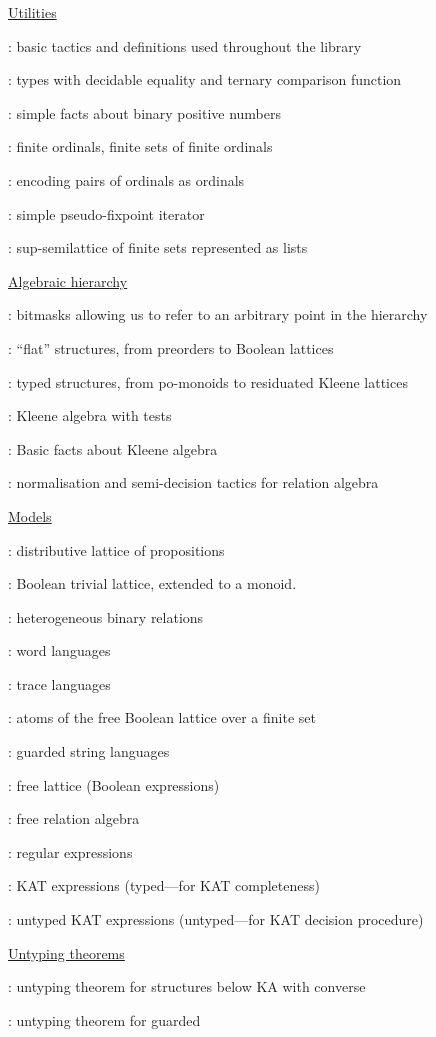 \documentclass[a4paper]{llncs}
\begin{document}
\newcommand\module[1]{\item \coqe:}
\begin{description}
  \item {}\ul{Utilities}
  \begin{description}
    \module{common} basic tactics and definitions used
    throughout the library
    \module{comparisons} types with decidable equality
    and ternary comparison function
    \module{positives} simple facts about binary positive numbers
    \module{ordinal} finite ordinals, finite sets of
    finite ordinals
    \module{pair} encoding pairs of ordinals as ordinals
    \module{powerfix} simple pseudo-fixpoint iterator
    \module{lset} sup-semilattice of finite sets represented as lists
  \end{description}
  \item {}\ul{Algebraic hierarchy}
  \begin{description}
    \module{level} bitmasks allowing us to refer to an
    arbitrary point in the hierarchy
    \module{lattice} ``flat'' structures, from preorders
    to Boolean lattices
    \module{monoid} typed structures, from po-monoids to residuated Kleene lattices
    \module{kat} Kleene algebra with tests
    \module{kleene} Basic facts about Kleene algebra
    \module{normalisation} normalisation and semi-decision tactics for relation algebra
  \end{description}
  \item {}\ul{Models}
    \begin{description}
    \module{prop} distributive lattice of propositions
    \module{boolean} Boolean trivial lattice, extended to a monoid.
    \module{rel} heterogeneous binary relations
    \module{lang} word languages
    \module{traces} trace languages
    \module{atoms} atoms of the free Boolean lattice over a finite set
    \module{glang} guarded string languages
    \module{lsyntax} free lattice (Boolean expressions)
    \module{syntax} free relation algebra
    \module{regex} regular expressions
    \module{gregex} KAT expressions (typed---for KAT completeness)
    \module{ugregex} untyped KAT expressions (untyped---for KAT decision procedure)
  \end{description}
  \item {}\ul{Untyping theorems}
  \begin{description}
    \module{untyping} untyping theorem for structures
    below KA with converse
    \module{kat_untyping} untyping theorem for guarded

\end{description}
\end{description}
\end{document}
